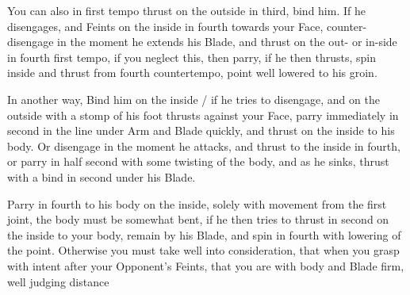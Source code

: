 You can also in first tempo thrust on the outside in third, bind
him. If he disengages, and Feints on the inside in fourth towards your
Face, counter-disengage in the moment he extends his Blade, and thrust
on the out- or in-side in fourth first tempo, if you neglect this,
then parry, if he then thrusts, spin inside and thrust from
fourth countertempo, point well lowered to his groin.


In another way, Bind him on the inside / if he tries to disengage, and
on the outside with a stomp of his foot thrusts against your Face,
parry immediately in second in the line under Arm and Blade quickly,
and thrust on the inside to his body. Or disengage in the moment he
attacks, and thrust to the inside in fourth, or parry in half second
with some twisting of the body, and as he sinks, thrust with a bind in
second under his Blade.


Parry in fourth to his body on the inside, solely with movement from
the first joint, the body must be somewhat bent, if he then tries to
thrust in second on the inside to your body, remain by his Blade, and
spin in fourth with lowering of the point. Otherwise you must take
well into consideration, that when you grasp with intent after your
Opponent's Feints, that you are with body and Blade firm, well judging distance
